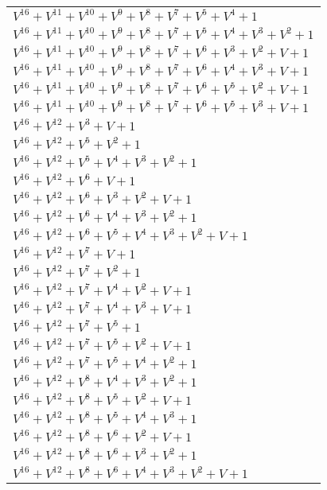 \documentclass[12pt]{article}
\begin{document}
\begin{adjustwidth}{-4cm}{}
\begin{center}
\begin{longtable}{|l|}
$V^{16}  +V^{11}  +V^{10}  +V^{9}  +V^{8}  +V^{7}  +V^{5}  +V^{4}  + 1$ \\
$V^{16}  +V^{11}  +V^{10}  +V^{9}  +V^{8}  +V^{7}  +V^{5}  +V^{4}  +V^{3}  +V^{2}  + 1$ \\
$V^{16}  +V^{11}  +V^{10}  +V^{9}  +V^{8}  +V^{7}  +V^{6}  +V^{3}  +V^{2}  + V + 1$ \\
$V^{16}  +V^{11}  +V^{10}  +V^{9}  +V^{8}  +V^{7}  +V^{6}  +V^{4}  +V^{3}  + V + 1$ \\
$V^{16}  +V^{11}  +V^{10}  +V^{9}  +V^{8}  +V^{7}  +V^{6}  +V^{5}  +V^{2}  + V + 1$ \\
$V^{16}  +V^{11}  +V^{10}  +V^{9}  +V^{8}  +V^{7}  +V^{6}  +V^{5}  +V^{3}  + V + 1$ \\
$V^{16}  +V^{12}  +V^{3}  + V + 1$ \\
$V^{16}  +V^{12}  +V^{5}  +V^{2}  + 1$ \\
$V^{16}  +V^{12}  +V^{5}  +V^{4}  +V^{3}  +V^{2}  + 1$ \\
$V^{16}  +V^{12}  +V^{6}  + V + 1$ \\
$V^{16}  +V^{12}  +V^{6}  +V^{3}  +V^{2}  + V + 1$ \\
$V^{16}  +V^{12}  +V^{6}  +V^{4}  +V^{3}  +V^{2}  + 1$ \\
$V^{16}  +V^{12}  +V^{6}  +V^{5}  +V^{4}  +V^{3}  +V^{2}  + V + 1$ \\
$V^{16}  +V^{12}  +V^{7}  + V + 1$ \\
$V^{16}  +V^{12}  +V^{7}  +V^{2}  + 1$ \\
$V^{16}  +V^{12}  +V^{7}  +V^{4}  +V^{2}  + V + 1$ \\
$V^{16}  +V^{12}  +V^{7}  +V^{4}  +V^{3}  + V + 1$ \\
$V^{16}  +V^{12}  +V^{7}  +V^{5}  + 1$ \\
$V^{16}  +V^{12}  +V^{7}  +V^{5}  +V^{2}  + V + 1$ \\
$V^{16}  +V^{12}  +V^{7}  +V^{5}  +V^{4}  +V^{2}  + 1$ \\
$V^{16}  +V^{12}  +V^{8}  +V^{4}  +V^{3}  +V^{2}  + 1$ \\
$V^{16}  +V^{12}  +V^{8}  +V^{5}  +V^{2}  + V + 1$ \\
$V^{16}  +V^{12}  +V^{8}  +V^{5}  +V^{4}  +V^{3}  + 1$ \\
$V^{16}  +V^{12}  +V^{8}  +V^{6}  +V^{2}  + V + 1$ \\
$V^{16}  +V^{12}  +V^{8}  +V^{6}  +V^{3}  +V^{2}  + 1$ \\
$V^{16}  +V^{12}  +V^{8}  +V^{6}  +V^{4}  +V^{3}  +V^{2}  + V + 1$ \\

\end{longtable}
\end{center}
\end{adjustwidth}
\end{document}
